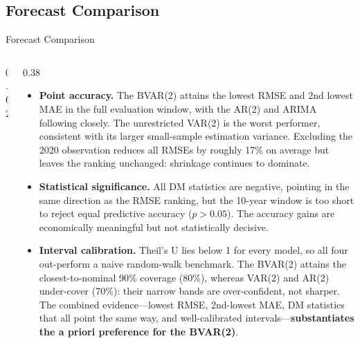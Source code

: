 \documentclass[9pt]{beamer}
\begin{document}
\subsection{Forecast Comparison}
\begin{frame}{Forecast Comparison}\label{slide15}

\small

\begin{columns}
  \begin{column}{0.62\textwidth}
\vspace{-0.2cm}
    {\fontsize{5}{5.5}\selectfont
    \setlength{\tabcolsep}{1.2pt}
    \setlength{\abovecaptionskip}{1pt}
    \setlength{\belowcaptionskip}{1pt}
    
    \vspace{0.1cm}
    
    \vspace{0.1cm}
    
    }
  \end{column}

  \begin{column}{0.38\textwidth}
    \tiny
    \begin{itemize}\setlength{\itemsep}{2pt}\setlength{\parskip}{0pt}
      \item \textbf{Point accuracy.} The BVAR(2) attains the lowest RMSE and 2nd lowest MAE in the full evaluation window, with the AR(2) and ARIMA following closely. The unrestricted VAR(2) is the worst performer, consistent with its larger small-sample estimation variance. Excluding the 2020 observation reduces all RMSEs by roughly 17\% on average but leaves the ranking unchanged: shrinkage continues to dominate.

      \item \textbf{Statistical significance.} All DM statistics are negative, pointing in the same direction as the RMSE ranking, but the 10-year window is too short to reject equal predictive accuracy ($p > 0.05$). The accuracy gains are economically meaningful but not statistically decisive.

      \item \textbf{Interval calibration.} Theil's U lies below 1 for every model, so all four out-perform a naive random-walk benchmark. The BVAR(2) attains the closest-to-nominal 90\% coverage (80\%), whereas VAR(2) and AR(2) under-cover (70\%): their narrow bands are over-confident, not sharper. The combined evidence---lowest RMSE, 2nd-lowest MAE, DM statistics that all point the same way, and well-calibrated intervals---\textbf{substantiates the a priori preference for the BVAR(2)}.
    \end{itemize}
  \end{column}
\end{columns}

\end{frame}
\end{document}
